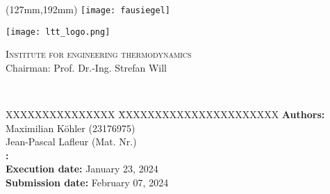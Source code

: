 \begin{titlepage}
	\thispagestyle{empty}

	\begin{textblock*}{\textwidth}(127mm,192mm)
	\texttt{[image: fausiegel]}
	\end{textblock*}

	\begin{minipage}[]{47mm}
		\texttt{[image: ltt\_logo.png]}
	\end{minipage}
	\begin{minipage}[]{.7\textwidth}
		\raggedleft
		\textsc{Institute for engineering thermodynamics}\\ %
		Chairman: Prof. Dr.-Ing. Strefan Will
	\end{minipage}
	
	\vspace{51mm}
	
	{\centering
	
	\large{\arbeit} \\	
	\Large{\textbf{\titel}}
	
	\par}
	
	\vspace{105mm}
	
	{\raggedright
	\begin{tabbing}
	XXXXXXXXXXXXXXX \= XXXXXXXXXXXXXXXXXXXXXX \kill
			\textbf{Authors:} 			\> Maximilian Köhler (23176975)		\\[6pt]
										\> Jean-Pascal Lafleur (Mat. Nr.)	\\[12pt]
			\textbf{\langdbbetreuer:}	\> \betreuer 						\\[12pt]
			\textbf{Execution date:}		\> January 23, 2024 \\[12pt]
			\textbf{Submission date:}	\> February 07, 2024														
	\end{tabbing}
	\par}
\end{titlepage}
